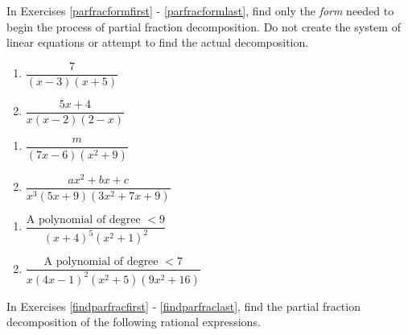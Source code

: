 \documentclass{ximera}
\begin{document}
	\author{Stitz-Zeager}



\label{ExercisesforParFrac}

In Exercises \ref{parfracformfirst} - \ref{parfracformlast},  find only the \emph{form} needed to begin the process of partial fraction decomposition.  Do not create the system of linear equations or attempt to find the actual decomposition.

\begin{multicols}{2}
\begin{enumerate}

\item $\dfrac{7}{(x - 3)(x + 5)}$ \label{parfracformfirst}
\item $\dfrac{5x + 4}{x(x - 2)(2 - x)}$

\setcounter{HW}{\value{enumi}}
\end{enumerate}
\end{multicols}

\begin{multicols}{2}
\begin{enumerate}
\setcounter{enumi}{\value{HW}}


\item $\dfrac{m}{(7x - 6)(x^{2} + 9)}$
\item $\dfrac{ax^{2} + bx + c}{x^3(5x + 9)(3x^{2} + 7x + 9)}$

\setcounter{HW}{\value{enumi}}
\end{enumerate}
\end{multicols}

\begin{multicols}{2}
\begin{enumerate}
\setcounter{enumi}{\value{HW}}

\item $\dfrac{\text{A polynomial of degree } < 9}{(x + 4)^{5}(x^{2} + 1)^{2}}$
\item $\dfrac{\text{A polynomial of degree } < 7}{x(4x - 1)^{2}(x^{2} + 5)(9x^{2} + 16)}$ \label{parfracformlast}

\setcounter{HW}{\value{enumi}}
\end{enumerate}
\end{multicols}


In Exercises \ref{findparfracfirst} - \ref{findparfraclast},  find the partial fraction decomposition of the following rational expressions.
\end{document}
